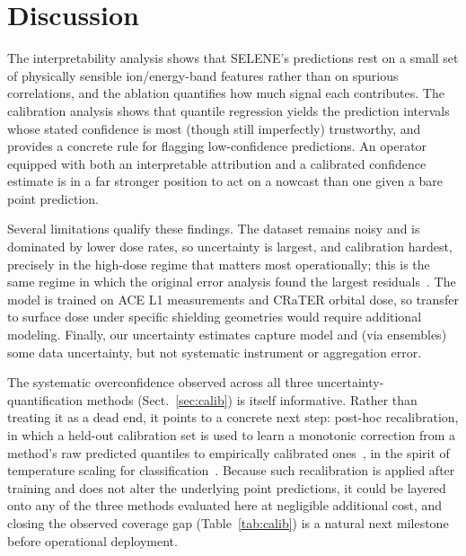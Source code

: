 \documentclass[graybox]{SNmult}
\begin{document}
\section{Discussion}
\label{sec:discussion}

The interpretability analysis shows that SELENE's
predictions rest on a small set of physically sensible ion/energy-band features
rather than on spurious correlations, and the ablation quantifies how much signal
each contributes. The calibration analysis shows that quantile regression
yields the prediction intervals whose stated confidence is most (though still
imperfectly) trustworthy, and provides a concrete rule for flagging
low-confidence predictions.
An operator equipped with both an interpretable attribution and a calibrated
confidence estimate is in a far stronger position to act on a nowcast than one
given a bare point prediction.

Several limitations qualify these findings. The dataset remains noisy and is
dominated by lower dose rates, so uncertainty is largest, and calibration hardest,
precisely in the high-dose regime that matters most operationally; this is the
same regime in which the original error analysis found the largest
residuals~\cite{tummala2025selene}. The model is trained on ACE L1 measurements
and CRaTER orbital dose, so transfer to surface dose under specific shielding
geometries would require additional modeling. Finally, our uncertainty estimates
capture model and (via ensembles) some data uncertainty, but not systematic
instrument or aggregation error.

The systematic overconfidence observed across all three uncertainty-
quantification methods (Sect.~\ref{sec:calib}) is itself informative. Rather
than treating it as a dead end, it points to a concrete next step: post-hoc
recalibration, in which a held-out calibration set is used to learn a monotonic
correction from a method's raw predicted quantiles to empirically calibrated
ones~\cite{kuleshov2018calibrated}, in the spirit of temperature scaling for
classification~\cite{guo2017calibration}. Because such recalibration is applied
after training and does not alter the underlying point predictions, it could be
layered onto any of the three methods evaluated here at negligible additional
cost, and closing the observed coverage gap (Table~\ref{tab:calib}) is a natural
next milestone before operational deployment.

\end{document}
